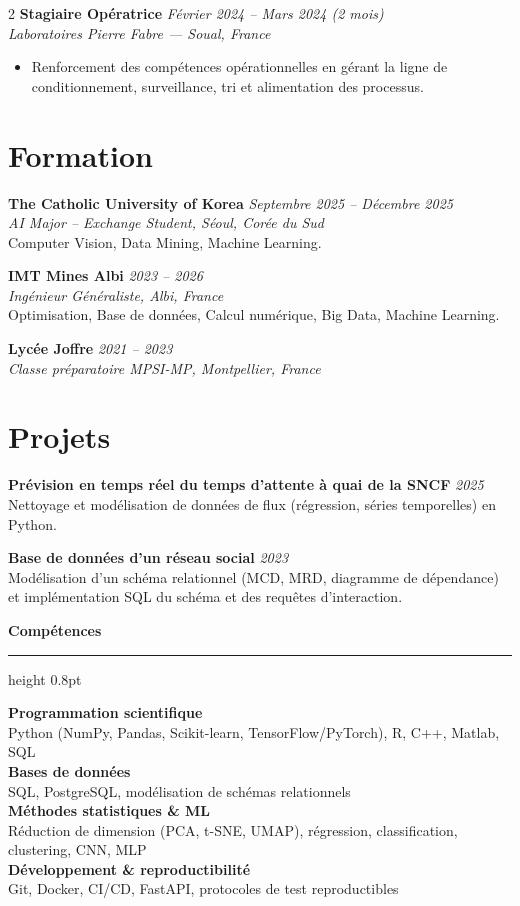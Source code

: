 \documentclass[10.5pt,a4paper]{article}
\newcommand{\sectionrule}{\vspace{-6pt}{\color{accent}\hrule height 1pt}\vspace{4pt}}
\newcommand{\subsectitle}[1]{%
  {\color{accent}\bfseries\large #1}\\[-2pt]
  {\color{accent}\hrule height 0.8pt}\vspace{5pt}
}
\newcommand{\cvexp}[5]{%
  \noindent\textbf{#1} \hfill {\itshape\color{graytext}\small #4}\\
  {\itshape #2 --- #3}\\[-2pt]
  #5
  \vspace{6pt}
}
\newcommand{\cvedu}[5]{%
  \noindent\textbf{#1} \hfill {\itshape\color{graytext}\small #4}\\
  {\itshape #2, #3}\\[1pt]
  {\small #5}
  \vspace{4pt}
}
\newcommand{\cveduplain}[4]{%
  \noindent\textbf{#1} \hfill {\itshape\color{graytext}\small #4}\\
  {\itshape #2, #3}
  \vspace{4pt}
}
\newcommand{\cvproject}[3]{%
  \noindent\textbf{#1} \hfill {\itshape\color{graytext}\small #2}\\[1pt]
  {\small #3}
  \vspace{3pt}
}
\newcommand{\sidebarline}[2]{%
  \noindent\textbf{\small #1}\\
  {\small #2}\\[3pt]
}
\begin{document}
\begin{paracol}{2}
\cvexp{Stagiaire Opératrice}{Laboratoires Pierre Fabre}{Soual, France}{Février 2024 -- Mars 2024 (2 mois)}{%
  \begin{itemize}[leftmargin=12pt, itemsep=2pt, topsep=0pt, partopsep=0pt, parsep=0pt]
    \item Renforcement des compétences opérationnelles en gérant la ligne de conditionnement, surveillance, tri et alimentation des processus.
  \end{itemize}
}

\section*{Formation}
\sectionrule

\cvedu{The Catholic University of Korea}{AI Major -- Exchange Student}{Séoul, Corée du Sud}{Septembre 2025 -- Décembre 2025}{Computer Vision, Data Mining, Machine Learning.}

\cvedu{IMT Mines Albi}{Ingénieur Généraliste}{Albi, France}{2023 -- 2026}{Optimisation, Base de données, Calcul numérique, Big Data, Machine Learning.}

\cveduplain{Lycée Joffre}{Classe préparatoire MPSI-MP}{Montpellier, France}{2021 -- 2023}

\section*{Projets}
\sectionrule

\cvproject{Prévision en temps réel du temps d'attente à quai de la SNCF}{2025}{Nettoyage et modélisation de données de flux (régression, séries temporelles) en Python.}

\cvproject{Base de données d'un réseau social}{2023}{Modélisation d'un schéma relationnel (MCD, MRD, diagramme de dépendance) et implémentation SQL du schéma et des requêtes d'interaction.}

\switchcolumn

\vspace{2pt}

\subsectitle{Compétences}

\sidebarline{Programmation scientifique}{Python (NumPy, Pandas, Scikit-learn, TensorFlow/\allowbreak PyTorch), R, C++, Matlab, SQL}
\sidebarline{Bases de données}{SQL, PostgreSQL, modélisation de schémas relationnels}
\sidebarline{Méthodes statistiques \& ML}{Réduction de dimension (PCA, t-SNE, UMAP), régression, classification, clustering, CNN, MLP}
\sidebarline{Développement \& reproductibilité}{Git, Docker, CI/CD, FastAPI, protocoles de test reproductibles}


\end{paracol}
\end{document}

